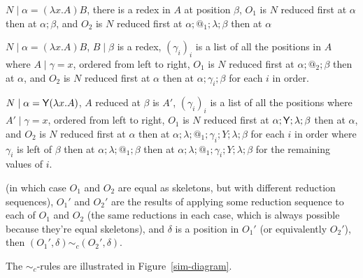 \begin{definition}
\begin{compactenum}[(i)]
\begin{compactenum}
        \item $N \mid \alpha = (\lambda x. A) B$, there is a redex in $A$ at position $\beta$, $O_1$ is $N$ reduced first at $\alpha$ then at $\alpha;\beta$, and $O_2$ is $N$ reduced first at $\alpha;@_1;\lambda;\beta$ then at $\alpha$
        
        \item $N \mid \alpha = (\lambda x. A) B$, $B \mid \beta$ is a redex, $(\gamma_i)_i$ is a list of all the positions in $A$ where $A \mid \gamma = x$, ordered from left to right, $O_1$ is $N$ reduced first at $\alpha ; @_2 ; \beta$ then at $\alpha$, and $O_2$ is $N$ reduced first at $\alpha$ then at $\alpha;\gamma_i;\beta$ for each $i$ in order.
        
        \item $N \mid \alpha = \mathsf{Y} (\lambda x. A)$, $A$ reduced at $\beta$ is $A'$, $(\gamma_i)_i$ is a list of all the positions where $A' \mid \gamma  = x$, ordered from left to right, $O_1$ is $N$ reduced first at $\alpha;\mathsf{Y};\lambda;\beta$ then at $\alpha$, and $O_2$ is $N$ reduced first at $\alpha$ then at $\alpha;\lambda;@_1;\gamma_i;Y;\lambda;\beta$ for each $i$ in order where $\gamma_i$ is left of $\beta$ then at $\alpha;\lambda;@_1;\beta$ then at $\alpha;\lambda;@_1;\gamma_i;Y;\lambda;\beta$ for the remaining values of $i$.
    \end{compactenum}
    (in which case $O_1$ and $O_2$ are equal as skeletons, but with different reduction sequences), $O_1'$ and $O_2'$ are the results of applying some reduction sequence to each of $O_1$ and $O_2$ (the same reductions in each case, which is always possible because they're equal skeletons), and $\delta$ is a position in $O_1'$ (or equivalently $O_2'$), then $(O_1',\delta) \sim_c (O_2',\delta)$.
\end{compactenum}

The $\sim_c$-rules are illustrated in Figure~\ref{sim-diagram}.
\end{definition}

